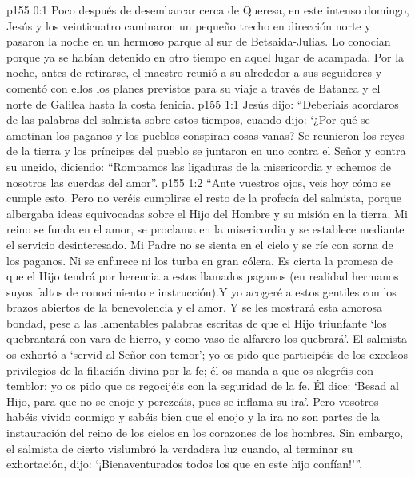 \author{Comisión de seres intermedios}
\vs p155 0:1 Poco después de desembarcar cerca de Queresa, en este intenso domingo, Jesús y los veinticuatro caminaron un pequeño trecho en dirección norte y pasaron la noche en un hermoso parque al sur de Betsaida\hyp{}Julias. Lo conocían porque ya se habían detenido en otro tiempo en aquel lugar de acampada. Por la noche, antes de retirarse, el maestro reunió a su alrededor a sus seguidores y comentó con ellos los planes previstos para su viaje a través de Batanea y el norte de Galilea hasta la costa fenicia.
\vs p155 1:1 Jesús dijo: “Deberíais acordaros de las palabras del salmista sobre estos tiempos, cuando dijo: ‘¿Por qué se amotinan los paganos y los pueblos conspiran cosas vanas? Se reunieron los reyes de la tierra y los príncipes del pueblo se juntaron en uno contra el Señor y contra su ungido, diciendo: “Rompamos las ligaduras de la misericordia y echemos de nosotros las cuerdas del amor”.
\vs p155 1:2 “Ante vuestros ojos, veis hoy cómo se cumple esto. Pero no veréis cumplirse el resto de la profecía del salmista, porque albergaba ideas equivocadas sobre el Hijo del Hombre y su misión en la tierra. Mi reino se funda en el amor, se proclama en la misericordia y se establece mediante el servicio desinteresado. Mi Padre no se sienta en el cielo y se ríe con sorna de los paganos. Ni se enfurece ni los turba en gran cólera. Es cierta la promesa de que el Hijo tendrá por herencia a estos llamados paganos (en realidad hermanos suyos faltos de conocimiento e instrucción).Y yo acogeré a estos gentiles con los brazos abiertos de la benevolencia y el amor. Y se les mostrará esta amorosa bondad, pese a las lamentables palabras escritas de que el Hijo triunfante ‘los quebrantará con vara de hierro, y como vaso de alfarero los quebrará’. El salmista os exhortó a ‘servid al Señor con temor’; yo os pido que participéis de los excelsos privilegios de la filiación divina por la fe; él os manda a que os alegréis con temblor; yo os pido que os regocijéis con la seguridad de la fe. Él dice: ‘Besad al Hijo, para que no se enoje y perezcáis, pues se inflama su ira’. Pero vosotros habéis vivido conmigo y sabéis bien que el enojo y la ira no son partes de la instauración del reino de los cielos en los corazones de los hombres. Sin embargo, el salmista de cierto vislumbró la verdadera luz cuando, al terminar su exhortación, dijo: ‘¡Bienaventurados todos los que en este hijo confían!’”.
